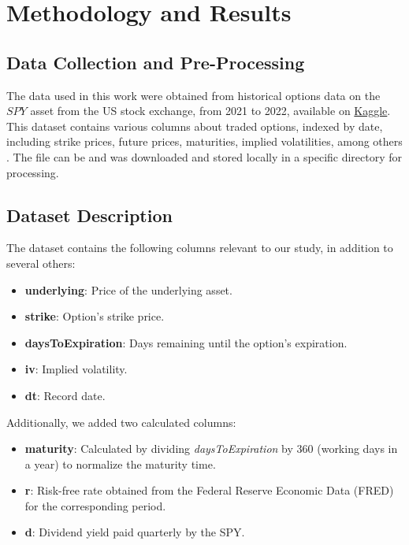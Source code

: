 \section{Methodology and Results}

\subsection{Data Collection and Pre-Processing}

The data used in this work were obtained from historical options data on the $SPY$ asset from the US stock exchange, from 2021 to 2022, available on \href{https://www.kaggle.com/datasets/shawlu/option-spy-dataset-combinedcsv}{Kaggle}. This dataset contains various columns about traded options, indexed by date, including strike prices, future prices, maturities, implied volatilities, among others \citep{}. The file can be and was downloaded and stored locally in a specific directory for processing.

\subsection{Dataset Description}

The dataset contains the following columns relevant to our study, in addition to several others:
\begin{itemize}
	\item \textbf{underlying}: Price of the underlying asset.
	\item \textbf{strike}: Option's strike price.
	\item \textbf{daysToExpiration}: Days remaining until the option's expiration.
	\item \textbf{iv}: Implied volatility.
	\item \textbf{dt}: Record date.
\end{itemize}

Additionally, we added two calculated columns:
\begin{itemize}
	\item \textbf{maturity}: Calculated by dividing \textit{daysToExpiration} by 360 (working days in a year) to normalize the maturity time.
	\item \textbf{r}: Risk-free rate obtained from the Federal Reserve Economic Data (FRED) for the corresponding period.
	\item \textbf{d}: Dividend yield paid quarterly by the SPY.
\end{itemize}

